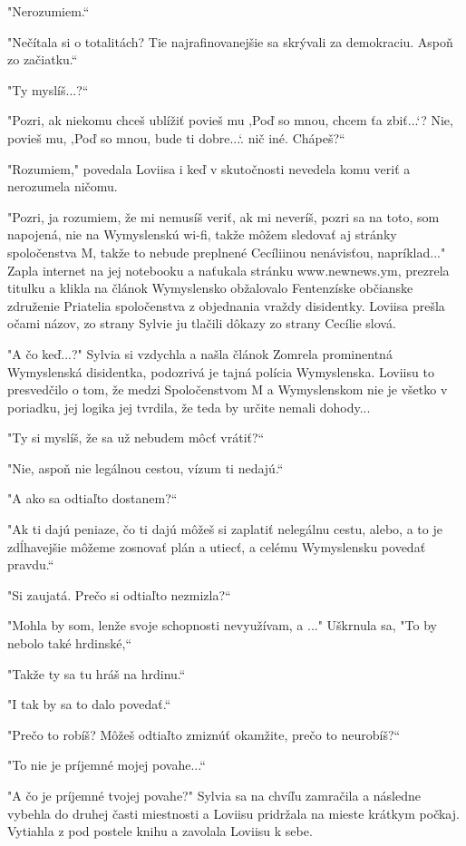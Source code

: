 \documentclass{book}
\begin{document}
"Nerozumiem.“

"Nečítala si o totalitách? Tie najrafinovanejšie sa skrývali za demokraciu. Aspoň zo začiatku.“

"Ty myslíš...?“

"Pozri, ak niekomu chceš ublížiť povieš mu ‚Poď so mnou, chcem ťa zbiť...‘? Nie, povieš mu, ‚Poď so mnou, bude ti dobre...‘. nič iné. Chápeš?“

"Rozumiem,"$ $ povedala Loviisa i keď v skutočnosti nevedela komu veriť a nerozumela ničomu.

"Pozri, ja rozumiem, že mi nemusíš veriť, ak mi neveríš, pozri sa na toto, som napojená, nie na Wymyslenskú wi-fi, takže môžem sledovať aj stránky spoločenstva M, takže to nebude preplnené Cecíliinou nenávisťou, napríklad..."$ $ Zapla internet na jej notebooku a naťukala stránku www.newnews.ym, prezrela titulku a klikla na článok Wymyslensko obžalovalo Fentenzíske občianske združenie Priatelia spoločenstva z objednania vraždy disidentky. Loviisa prešla očami názov, zo strany Sylvie ju tlačili dôkazy zo strany Cecílie slová.

"$ $A čo keď...?"$ $ Sylvia si vzdychla a našla článok Zomrela prominentná Wymyslenská disidentka, podozrivá je tajná polícia Wymyslenska. Loviisu to presvedčilo o tom, že medzi Spoločenstvom M a Wymyslenskom nie je všetko v poriadku, jej logika jej tvrdila, že teda by určite nemali dohody...

"Ty si myslíš, že sa už nebudem môcť vrátiť?“

"Nie, aspoň nie legálnou cestou, vízum ti nedajú.“

"$ $A ako sa odtiaľto dostanem?“

"$ $Ak ti dajú peniaze, čo ti dajú môžeš si zaplatiť nelegálnu cestu, alebo, a to je zdĺhavejšie môžeme zosnovať plán a utiecť, a celému Wymyslensku povedať pravdu.“

"Si zaujatá. Prečo si odtiaľto nezmizla?“

"Mohla by som, lenže svoje schopnosti nevyužívam, a ..."$ $ Uškrnula sa, "To by nebolo také hrdinské,“

"Takže ty sa tu hráš na hrdinu.“

"$ $I tak by sa to dalo povedať.“

"Prečo to robíš? Môžeš odtiaľto zmiznúť okamžite, prečo to neurobíš?“

"To nie je príjemné mojej povahe...“

"$ $A čo je príjemné tvojej povahe?"$ $ Sylvia sa na chvíľu zamračila a následne vybehla do druhej časti miestnosti a Loviisu pridržala na mieste krátkym počkaj. Vytiahla z pod postele knihu a zavolala Loviisu k sebe.
\end{document}
